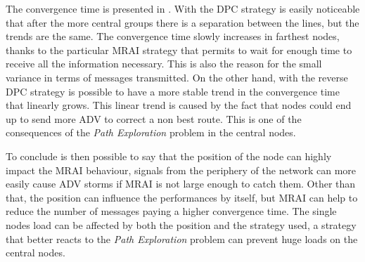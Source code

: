 The convergence time is presented in
.
With the \ac{DPC} strategy is easily noticeable that after the
more central groups there is a separation between the lines, but the trends
are the same.
The convergence time slowly increases in farthest nodes, thanks to the particular
\ac{MRAI} strategy that permits to wait for enough time to receive all the information
necessary.
This is also the reason for the small variance in terms of messages transmitted.
On the other hand, with the reverse \ac{DPC} strategy is possible to have a
more stable trend in the convergence time that linearly grows.
This linear trend is caused by the fact that nodes could end up to send more
\ac{ADV} to correct a non best route.
This is one of the consequences of the \textit{Path Exploration} problem in
the central nodes.

To conclude is then possible to say that the position of the node can highly impact
the \ac{MRAI} behaviour, signals from the periphery of the network can more
easily cause \ac{ADV} storms if \ac{MRAI} is not large enough to catch them.
Other than that, the position can influence the performances by itself, but
\ac{MRAI} can help to reduce the number of messages paying a higher convergence
time.
The single nodes load can be affected by both the position and the strategy
used, a strategy that better reacts to the \textit{Path Exploration} problem
can prevent huge loads on the central nodes.


